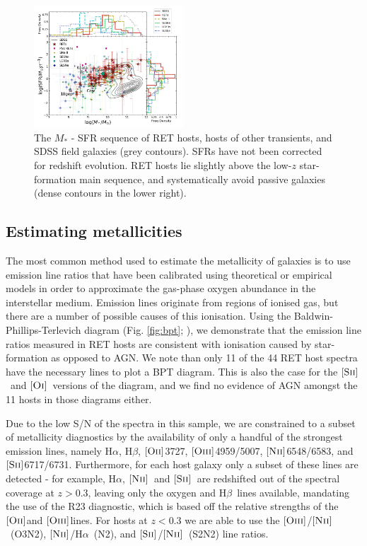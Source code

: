 \documentclass[fleqn,usenatbib,]{mnras}
\newcommand{\halpha}[0]{H$\alpha$}
\newcommand{\hbeta}[0]{H$\beta$}
\newcommand{\OII}[0]{$[\textnormal{\textsc{Oii}}]$}
\newcommand{\OI}[0]{$[\textnormal{\textsc{Oi}}]$}
\newcommand{\OIII}[0]{$[\textnormal{\textsc{Oiii}}]$}
\newcommand{\SII}[0]{$[\textnormal{\textsc{Sii}}]$}
\newcommand{\NII}[0]{$[\textnormal{\textsc{Nii}}]$}
\begin{document}
\begin{figure}
\includegraphics[width=0.5\textwidth]{figs/SFR_Mike.png}
\caption{The $M_*$ - SFR sequence of RET hosts, hosts of other transients, and SDSS field galaxies (grey contours). SFRs have not been corrected for redshift evolution. RET hosts lie slightly above the low-$z$ star-formation main sequence, and systematically avoid passive galaxies (dense contours in the lower right).
\label{fig:sfms_sfr}}
\end{figure}


\subsection{Estimating metallicities \label{subsec:calc_Z}}

The most common method used to estimate the metallicity of galaxies is to use emission line ratios that have been calibrated using theoretical or empirical models in order to approximate the gas-phase oxygen abundance in the interstellar medium. Emission lines originate from regions of ionised gas, but there are a number of possible causes of this ionisation. Using the Baldwin-Phillips-Terlevich diagram (Fig. \ref{fig:bpt}; \citealt{Baldwin1981}), we demonstrate that the emission line ratios measured in RET hosts are consistent with ionisation caused by star-formation as opposed to AGN. We note than only 11 of the 44 RET host spectra have the necessary lines to plot a BPT diagram. This is also the case for the \SII~and \OI~versions of the diagram, and we find no evidence of AGN amongst the 11 hosts in those diagrams either.

Due to the low S/N of the spectra in this sample, we are constrained to a subset of metallicity diagnostics by the availability of only a handful of the strongest emission lines, namely \halpha, \hbeta, \OII 3727, \OIII 4959/5007, \NII 6548/6583, and \SII 6717/6731. Furthermore, for each host galaxy only a subset of these lines are detected - for example, \halpha, \NII~and \SII~are redshifted out of the spectral coverage at $z>0.3$, leaving only the oxygen and \hbeta~lines available, mandating the use of the R23 diagnostic, which is based off the relative strengths of the \OII and \OIII lines. For hosts at $z<0.3$ we are able to use the \OIII /\NII~(O3N2), \NII /\halpha~(N2), and \SII /\NII~(S2N2) line ratios. 
\end{document}
